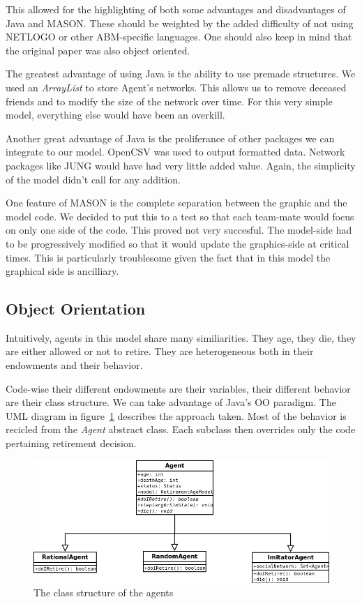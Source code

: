 \documentclass[runningheads,a4paper]{llncs}
\begin{document}
This allowed for the highlighting of both some advantages and disadvantages of Java and MASON.
These should be weighted by the added difficulty of not using NETLOGO or other ABM-specific languages.
One should also keep in mind that the original paper was also object oriented.

The greatest advantage of using Java is the ability to use premade structures.
We used an \textit{ArrayList} to store Agent's networks.
This allows us to remove deceased friends and to modify the size of the network over time.
For this very simple model, everything else would have been an overkill.

Another great advantage of Java is the proliferance of other packages we can integrate to our model.
OpenCSV was used to output formatted data.
Network packages like JUNG would have had very little added value.
Again, the simplicity of the model didn't call for any addition.

One feature of MASON is the complete separation between the graphic and the model code.
We decided to put this to a test so that each team-mate would focus on only one side of the code.
This proved not very succesful.
The model-side had to be progressively modified so that it would update the graphics-side at critical times.
This is particularly troublesome given the fact that in this model the graphical side is ancilliary.

\subsection{Object Orientation}

Intuitively, agents in this model share many similiarities.
They age, they die, they are either allowed or not to retire.
They are heterogeneous both in their endowments and their behavior.

Code-wise their different endowments are their variables, their different behavior are their class structure.
We can take advantage of Java's OO paradigm.
The UML diagram in figure~\ref{UML} describes the approach taken.
Most of the behavior is recicled from the \textit{Agent} abstract class.
Each subclass then overrides only the code pertaining retirement decision.

\begin{figure}
 \begin{center}
  \includegraphics[scale=.45]{figs/UML.png}
\caption{The class structure of the agents}
\label{UML}
 \end{center}
\end{figure}
\end{document}

